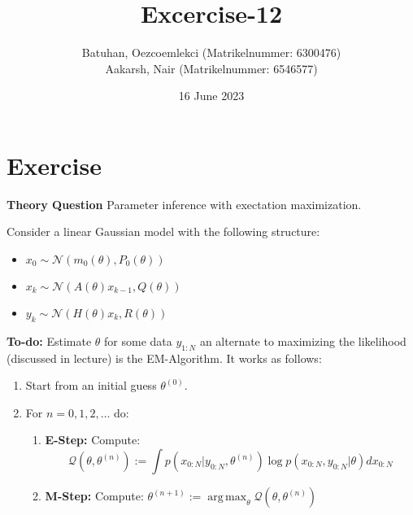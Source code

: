 \documentclass{tufte-handout}
\title{Excercise-12}
\author{Batuhan, Oezcoemlekci (Matrikelnummer: 6300476) \\
        Aakarsh, Nair (Matrikelnummer: 6546577)}
\date{16 June 2023}
\DeclareMathOperator*{\argmax}{arg\,max}
\begin{document}
\maketitle%

\section{Exercise}

\textbf{Theory Question} Parameter inference with exectation maximization.

Consider a linear Gaussian model with  the following structure:
\begin{itemize}
    \item $x_0 \sim \mathcal{N}(m_0(\theta), P_0(\theta))$
    \item $x_k \sim \mathcal{N}(A(\theta) x_{k-1}, Q(\theta))$
    \item $y_k \sim \mathcal{N}(H(\theta) x_{k}, R(\theta))$
\end{itemize}

\textbf{To-do:} Estimate $\theta$ for some data $y_{1:N}$ an alternate to 
maximizing the likelihood (discussed in lecture) is the EM-Algorithm.
It works as follows: 
\begin{enumerate}
    \item  Start from an initial guess $\theta^{(0)}$.
    \item For $n = 0, 1, 2, \dots$ do:
    \begin{enumerate}
        \item \textbf{E-Step:} Compute:  \\
        \begin{equation}
            \mathcal{Q}\left( \theta, \theta^{(n)} \right) := \int p(x_{0:N} | y_{0:N}, \theta^{(n)}) \log p(x_{0:N}, y_{0:N} | \theta) dx_{0:N}
        \end{equation}
            
        \item \textbf{M-Step:} Compute: $\theta^{(n+1)} := \argmax_{\theta} \mathcal{Q}(\theta, \theta^{(n)})$ 
    \end{enumerate}
\end{enumerate}
\end{document}
